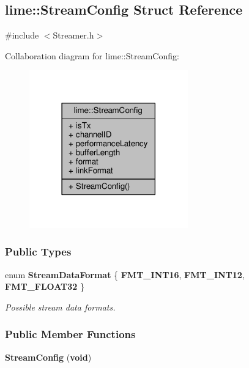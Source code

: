 \subsection{lime\+:\+:Stream\+Config Struct Reference}
\label{structlime_1_1StreamConfig}


{\ttfamily \#include $<$Streamer.\+h$>$}



Collaboration diagram for lime\+:\+:Stream\+Config\+:
\nopagebreak
\begin{figure}[H]
\begin{center}
\leavevmode
\includegraphics[width=194pt]{dd/d8f/structlime_1_1StreamConfig__coll__graph}
\end{center}
\end{figure}
\subsubsection*{Public Types}
\begin{DoxyCompactItemize}
\item 
enum {\bf Stream\+Data\+Format} \{ {\bf F\+M\+T\+\_\+\+I\+N\+T16}, 
{\bf F\+M\+T\+\_\+\+I\+N\+T12}, 
{\bf F\+M\+T\+\_\+\+F\+L\+O\+A\+T32}
 \}\begin{DoxyCompactList}\small\item\em Possible stream data formats. \end{DoxyCompactList}
\end{DoxyCompactItemize}
\subsubsection*{Public Member Functions}
\begin{DoxyCompactItemize}
\item 
{\bf Stream\+Config} ({\bf void})
\end{DoxyCompactItemize}
